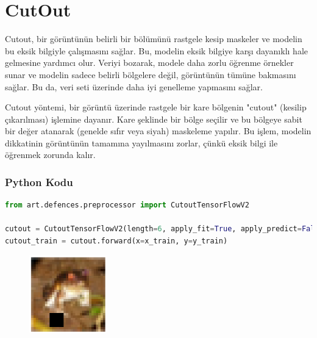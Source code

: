 \section{CutOut}

Cutout, bir görüntünün belirli bir bölümünü rastgele kesip maskeler ve modelin bu eksik bilgiyle çalışmasını sağlar. Bu, modelin eksik bilgiye karşı dayanıklı hale gelmesine yardımcı olur. Veriyi bozarak, modele daha zorlu öğrenme örnekler sunar ve modelin sadece belirli bölgelere değil, görüntünün tümüne bakmasını sağlar. Bu da, veri seti üzerinde daha iyi genelleme yapmasını sağlar.

Cutout yöntemi, bir görüntü üzerinde rastgele bir kare bölgenin "cutout" (kesilip çıkarılması) işlemine dayanır. Kare şeklinde bir bölge seçilir ve bu bölgeye sabit bir değer atanarak (genelde sıfır veya siyah) maskeleme yapılır. Bu işlem, modelin dikkatinin görüntünün tamamına yayılmasını zorlar, çünkü eksik bilgi ile öğrenmek zorunda kalır.

\subsubsection{Python Kodu}

\begin{lstlisting}[language=Python]
from art.defences.preprocessor import CutoutTensorFlowV2

cutout = CutoutTensorFlowV2(length=6, apply_fit=True, apply_predict=False)
cutout_train = cutout.forward(x=x_train, y=y_train)
\end{lstlisting}

\begin{figure}[h]
    \centering
    \includegraphics[width=0.3\textwidth]{images/cutout_example.png}
    \caption{}
\end{figure}

\newpage